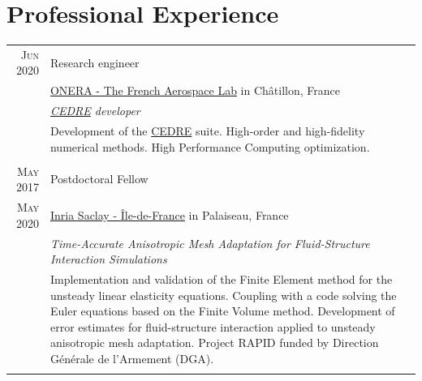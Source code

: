 \documentclass[a4paper,10pt]{article}
\begin{document}
\section{Professional Experience}
\begin{tabular}{r|p{15cm}}
            \textsc{Jun 2020}                                   & Research engineer                                                                     \\
     & \href{https://www.onera.fr/en}{ONERA - The French Aerospace Lab} in Châtillon, France               \\
                                                                               & \emph{\href{https://cedre.onera.fr/}{CEDRE} developer}                                                  \\
                                                                               & \footnotesize{Development of the \href{https://cedre.onera.fr/}{CEDRE} suite. High-order and high-fidelity numerical methods. High Performance Computing optimization. } \\
    \multicolumn{2}{c}{}                                                                                                                                             \\
                \textsc{May 2017}                                   & Postdoctoral Fellow                                                                     \\
    \textsc{May 2020} & \href{https://www.inria.fr/en/centre-inria-saclay-ile-de-france}{Inria Saclay - Île-de-France} in Palaiseau, France               \\
                                                                               & \emph{Time-Accurate Anisotropic Mesh Adaptation for Fluid-Structure Interaction Simulations}                                                  \\
                                                                               & \footnotesize{Implementation and validation of the Finite Element method for the unsteady linear elasticity equations. Coupling with a code solving the Euler equations based on the Finite Volume method. Development of error estimates for fluid-structure interaction applied to unsteady anisotropic mesh adaptation. Project RAPID funded by Direction Générale de l'Armement (DGA). } \\
    \multicolumn{2}{c}{}                                                                                                                                             \\
                                        \end{tabular}
\end{document}
